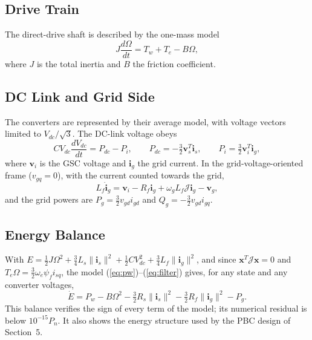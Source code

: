 \documentclass[11pt,a4paper]{article}
\newcommand{\bv}[1]{\mathbf{#1}}
\newcommand{\Jm}{\boldsymbol{\mathcal{J}}}
\begin{document}
\subsection{Drive Train}
The direct-drive shaft is described by the one-mass model
\begin{equation}
J\frac{d\Omega}{dt} = T_w + T_e - B\Omega ,
\label{eq:shaft}
\end{equation}
where $J$ is the total inertia and $B$ the friction coefficient.

\subsection{DC Link and Grid Side}
The converters are represented by their average model, with voltage vectors limited to $V_{dc}/\sqrt3$.
The DC-link voltage obeys~\cite{aimene2022}
\begin{equation}
CV_{dc}\frac{dV_{dc}}{dt} = P_{dc} - P_i,\qquad P_{dc}=-\tfrac32\bv{v}_s^T\bv{i}_s,\qquad
P_i=\tfrac32\bv{v}_i^T\bv{i}_g ,
\label{eq:dc}
\end{equation}
where $\bv{v}_i$ is the GSC voltage and $\bv{i}_g$ the grid current. In the grid-voltage-oriented frame
($v_{gq}=0$), with the current counted towards the grid,
\begin{equation}
L_f\dot{\bv{i}}_g = \bv{v}_i - R_f\bv{i}_g + \omega_gL_f\Jm\bv{i}_g - \bv{v}_g ,
\label{eq:filter}
\end{equation}
and the grid powers are $P_g=\frac32v_{gd}i_{gd}$ and $Q_g=-\frac32v_{gd}i_{gq}$.

\subsection{Energy Balance}
With $E=\frac12J\Omega^2+\frac34L_s\|\bv{i}_s\|^2+\frac12CV_{dc}^2+\frac34L_f\|\bv{i}_g\|^2$, and since
$\bv{x}^T\Jm\bv{x}=0$ and $T_e\Omega=\frac32\omega_e\psi_fi_{sq}$, the model (\ref{eq:pw})--(\ref{eq:filter})
gives, for any state and any converter voltages,
\begin{equation}
\dot E = P_w - B\Omega^2 - \tfrac32R_s\|\bv{i}_s\|^2 - \tfrac32R_f\|\bv{i}_g\|^2 - P_g .
\label{eq:balance}
\end{equation}
This balance verifies the sign of every term of the model; its numerical residual is below
$10^{-15}P_n$. It also shows the energy structure used by the PBC design of Section~5.
\end{document}
